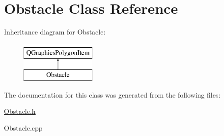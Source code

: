 \hypertarget{class_obstacle}{\section{Obstacle Class Reference}
\label{class_obstacle}
}
Inheritance diagram for Obstacle\-:\begin{figure}[H]
\begin{center}
\leavevmode
\includegraphics[height=2.000000cm]{class_obstacle}
\end{center}
\end{figure}


The documentation for this class was generated from the following files\-:\begin{DoxyCompactItemize}
\item 
\hyperlink{_obstacle_8h}{Obstacle.\-h}\item 
Obstacle.\-cpp\end{DoxyCompactItemize}
